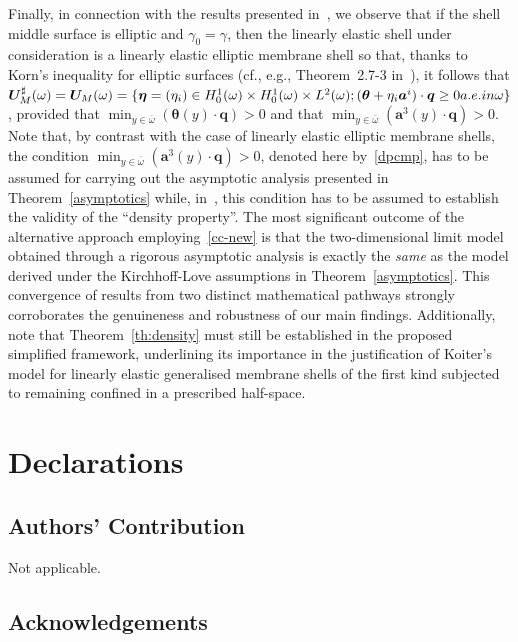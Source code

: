 \documentclass{amsart}
\begin{document}
Finally, in connection with the results presented in~\cite{CiaPie2018b,CiaPie2018bCR,CiaMarPie2018b,CiaMarPie2018}, we observe that if the shell middle surface is elliptic and $\gamma_0=\gamma$, then the linearly elastic shell under consideration is a linearly elastic elliptic membrane shell so that, thanks to Korn's inequality for elliptic surfaces (cf., e.g., Theorem~2.7-3 in~\cite{Ciarlet2000}), it follows that $\bm{U}_M^\sharp(\omega)=\bm{U}_M(\omega)=\{\bm{\eta}=(\eta_i)\in H^1_0(\omega)\times H^1_0(\omega) \times L^2(\omega); (\bm{\theta}+\eta_i \bm{a}^i)\cdot\bm{q}\ge 0 \textup{ a.e. in }\omega\}$, provided that $\min_{y\in\overline{\omega}}(\bm{\theta}(y)\cdot\bm{q})>0$ and that $\min_{y\in\overline{\omega}}(\bm{a}^3(y)\cdot\bm{q})>0$. Note that, by contrast with the case of linearly elastic elliptic membrane shells, the condition $\min_{y\in\overline{\omega}}(\bm{a}^3(y)\cdot\bm{q})>0$, denoted here by~\eqref{dpcmp}, has to be assumed for carrying out the asymptotic analysis presented in Theorem~\ref{asymptotics} while, in~\cite{CiaMarPie2018b,CiaMarPie2018}, this condition has to be assumed to establish the validity of the ``density property''.
The most significant outcome of the alternative approach employing~\eqref{cc-new} is that the two-dimensional limit model obtained through a rigorous asymptotic analysis is exactly the \emph{same} as the model derived under the Kirchhoff-Love assumptions in Theorem~\ref{asymptotics}. This convergence of results from two distinct mathematical pathways strongly corroborates the genuineness and robustness of our main findings.
Additionally, note that Theorem~\ref{th:density} must still be established in the proposed simplified framework, underlining its importance in the justification of Koiter's model for linearly elastic generalised membrane shells of the first kind subjected to remaining confined in a prescribed half-space.

\section*{Declarations}

\subsection*{Authors' Contribution}

Not applicable.

\subsection*{Acknowledgements}
\end{document}
